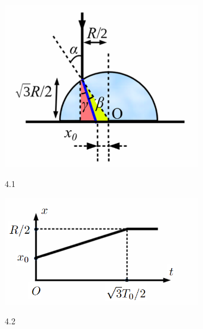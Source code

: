 \begin{figure}[h]
  \centering
  \begin{subfigure}[b]{0.49\textwidth}
    \centering
    \includegraphics[width=0.95\textwidth]{Figures/Solutions/Fig 4.1.png}
    \begin{center}
      \figurename{ 4.1}
    \end{center}
  \end{subfigure}
  \hfill
  \begin{subfigure}[b]{0.49\textwidth}
    \centering
    \includegraphics[width=0.95\textwidth]{Figures/Solutions/Fig 4.2.png}
    \begin{center}
      \figurename{ 4.2}
    \end{center}
  \end{subfigure}
\end{figure}

